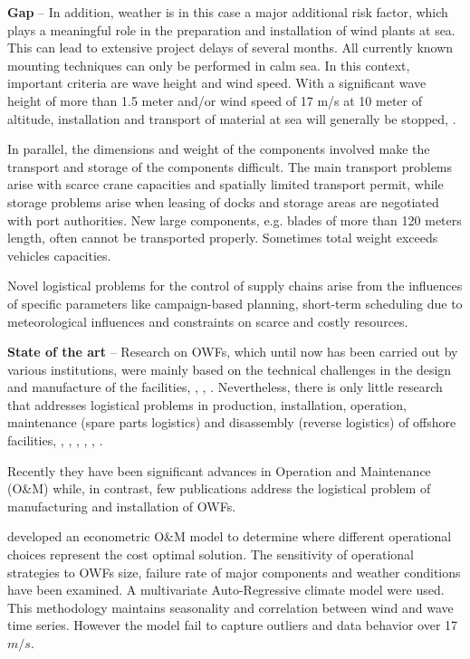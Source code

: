 \textbf{Gap} --
In addition, weather is in this case a major additional risk factor, which plays a meaningful role in the preparation and installation of wind plants at sea. This can lead to extensive project delays of several months. All currently known mounting techniques can only be performed in calm sea. In this context, important criteria are wave height and wind speed. With a significant wave height of more than 1.5 meter and/or wind speed of 17 m/s at 10 meter of altitude, installation and transport of material at sea will generally be stopped, \cite{aitsimulation}.

In parallel, the dimensions and weight of the components involved make the transport and storage of the components difficult. The main transport problems arise with scarce crane capacities and spatially limited transport permit, while storage problems arise when leasing of docks and storage areas are negotiated with port authorities. New large components, e.g. blades of more than 120 meters length, often cannot be transported properly. Sometimes total weight exceeds vehicles capacities.

Novel logistical problems for the control of supply chains arise from the influences of specific parameters like campaign-based planning, short-term scheduling due to meteorological influences and constraints on scarce and costly resources.

\textbf{State of the art} --
Research on OWFs, which until now has been carried out by various institutions, were mainly based on the technical challenges in the design and manufacture of the facilities, \cite{Miller2013}, \cite{SerranoGonzalez2014}, \cite{Perveen2014}. Nevertheless, there is only little research that addresses logistical problems in production, installation, operation, maintenance (spare parts logistics) and disassembly (reverse logistics) of offshore facilities, \cite{Scholz2010}, \cite{Lange2012}, \cite{COMPIT11}, \cite{COMPIT12}, \cite{aitsimulation}, \cite{thalji2012}.

Recently they have been significant advances in Operation and Maintenance (O\&M) while, in contrast, few publications address the logistical problem of manufacturing and installation of OWFs.

\cite{dinwoodie2013} developed an econometric O\&M model to determine where different operational choices represent the cost optimal solution. The sensitivity of operational strategies to OWFs size, failure rate of major components and weather conditions have been examined. A multivariate Auto-Regressive climate model were used. This methodology maintains seasonality and correlation between wind and wave time series. However the model fail to capture outliers and data behavior over 17 $m/s$.


